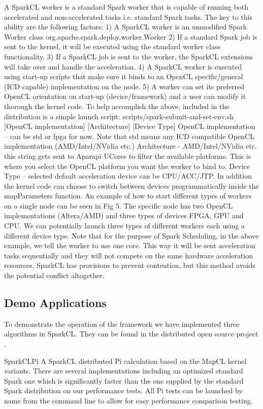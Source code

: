 \documentclass[runningheads,a4paper]{llncs}
\begin{document}
A SparkCL worker is a standard Spark worker that is capable of running both accelerated and non-accelerated tasks i.e. standard Spark tasks. The key to this ability are the following factors:
1) A SparkCL worker is an unmodified Spark Worker class org.apache.spark.deploy.worker.Worker
2) If a standard Spark job is sent to the kernel, it will be executed using the standard worker class functionality.
3) If a SparkCL job is sent to the worker, the SparkCL extensions will take over and handle the acceleration.
4) A SparkCL worker is executed using start-up scripts that make sure it binds to an OpenCL specific/general (ICD capable) implementation on the node.
5) A worker can set its preferred OpenCL orientation on start-up (device/framework) and a user can modify it thorough the kernel code.
To help accomplish the above, included in the distribution is a simple launch script:
scripts/spark-submit-and-set-env.sh [OpenCL implementation] [Architecture] [Device Type]
OpenCL implementation – can be std or fpga for now. Note that std means any ICD compatible OpenCL implementation (AMD/Intel/NVidia etc.)
Architecture - AMD/Intel/NVidia etc. this string gets sent to Aparapi UCores to filter the available platforms. This is where you select the OpenCL platform you want the worker to bind to.
Device Type – selected default acceleration device can be CPU/ACC/JTP. In addition the kernel code can choose to switch between devices programmatically inside the mapParameters function.
An example of how to start different types of workers on a single node can be seen in Fig 5. The specific node has two OpenCL implementations (Altera/AMD) and three types of devices FPGA, GPU and CPU. We can potentially launch three types of different workers each using a different device type. Note that for the purpose of Spark Scheduling, in the above example, we tell the worker to use one core. This way it will be sent acceleration tasks sequentially and they will not compete on the same hardware acceleration resources. SparkCL has provisions to prevent contention, but this method avoids the potential conflict altogether.

\subsection{Demo Applications}
To demonstrate the operation of the framework we have implemented three algorithms in SparkCL. They can be found in the distributed open source project \cite{SparkCL:2015, Xin:2013}.

SparkCLPi
A SparkCL distributed Pi calculation based on the MapCL kernel variants. There are several implementations including an optimized standard Spark one which is significantly faster than the one supplied by the standard Spark distribution on our performance tests. All Pi tests can be launched by name from the command line to allow for easy performance comparison testing.
\end{document}
